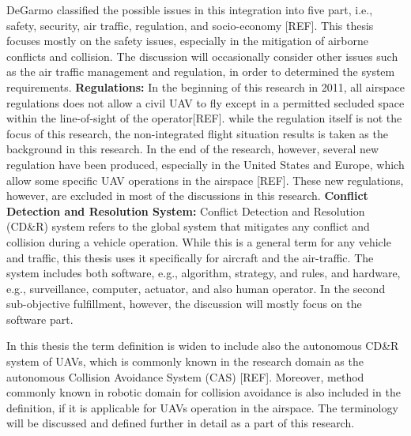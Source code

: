 DeGarmo classified the possible issues in this integration into five part, i.e., safety, security, air traffic, regulation, and socio-economy [REF]. This thesis focuses mostly on the safety issues, especially in the mitigation of airborne conflicts and collision. The discussion will occasionally consider other issues such as the air traffic management and regulation, in order to determined the system requirements.
\newline \newline
\textbf{Regulations:}   \qquad In the beginning of this research in 2011, all airspace regulations does not allow a civil UAV to fly except in a permitted secluded space within the line-of-sight of the operator[REF]. while the regulation itself is not the focus of this research, the non-integrated flight situation results is taken as the background in this research. In the end of the research, however, several new regulation have been produced, especially in the United States and Europe, which allow some specific UAV operations in the airspace [REF]. These new regulations, however, are excluded in most of the discussions in this research.
\newline \newline
\textbf{Conflict Detection and Resolution System:}     \quad   Conflict Detection and Resolution (CD\&R) system refers to the global system that mitigates any conflict and collision during a vehicle operation. While this is a general term for any vehicle and traffic, this thesis uses it specifically for aircraft and the air-traffic. The system includes both software, e.g., algorithm, strategy, and rules, and hardware, e.g., surveillance, computer, actuator, and also human operator. In the second sub-objective fulfillment, however, the discussion will mostly focus on the software part.

In this thesis the term definition is widen to include also the autonomous CD\&R system of UAVs, which is commonly known in the research domain as the autonomous Collision Avoidance System (CAS) [REF]. Moreover, method commonly known in robotic domain for collision avoidance is also included in the definition, if it is applicable for UAVs operation in the airspace. The terminology will be discussed and defined further in detail as a part of this research.   
\newline
\newline

